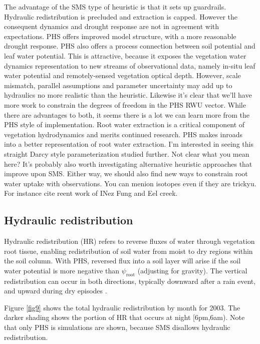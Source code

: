 \documentclass[draft,linenumbers]{agujournal}
\begin{document}
The advantage of the SMS type of heuristic is that it sets up guardrails.
Hydraulic redistribution is precluded and extraction is capped.
However the consequent dynamics and drought response are not in agreement with expectations.
PHS offers improved model structure, with a more reasonable drought response.
PHS also offers a process connection between soil potential and leaf water potential.
This is attractive, because it exposes the vegetation water dynamics representation to new streams of observational data, 
namely in-situ leaf water potential and remotely-sensed vegetation optical depth.
However, scale mismatch, parallel assumptions and parameter uncertainty may add up to hydraulics no more realistic than the heuristic.
Likewise it's clear that we'll have more work to constrain the degrees of freedom in the PHS RWU vector.
While there are advantages to both, it seems there is a lot we can learn more from the PHS style of implementation.
Root water extraction is a critical component of vegetation hydrodynamics and merits continued research.
PHS makes inroads into a better representation of root water extraction.
I'm interested in seeing this straight Darcy style parameterization studied further. Not clear what you mean here? 
It's probably also worth investigating alternative heuristic approaches that improve upon SMS.
Either way, we should also find new ways to constrain root water uptake with observations. You can menion isotopes even if they are trickyu. For instance cite reent work of INez Fung and Eel creek.


\subsection{Hydraulic redistribution}

Hydraulic redistribution (HR) refers to reverse fluxes of water through vegetation root tissue, enabling redistribution of soil water from moist to dry regions within the soil column.
With PHS, reversed flux into a soil layer will arise if the soil water potential is more negative than $\psi_{\text{root}}$ (adjusting for gravity).
The vertical redistribution can occur in both directions, typically downward after a rain event, and upward during dry episodes \citep{burgess1998}.

Figure \ref{fig9} shows the total hydraulic redistribution by month for 2003. 
The darker shading shows the portion of HR that occurs at night [6pm,6am). 
Note that only PHS is simulations are shown, because SMS disallows hydraulic redistribution.
\end{document}
